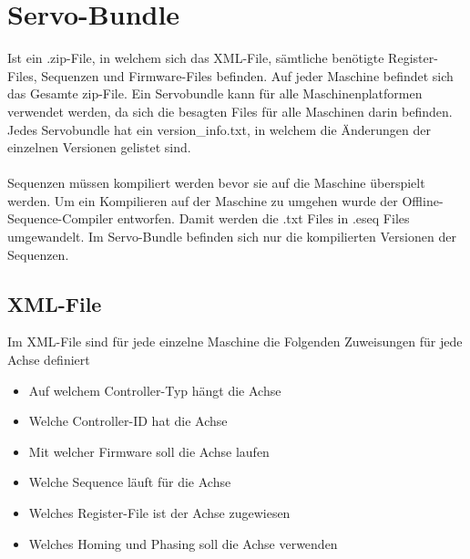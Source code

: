 \section{Servo-Bundle}
	Ist ein .zip-File, in welchem sich das XML-File, sämtliche benötigte Register-Files, Sequenzen und Firmware-Files befinden. Auf jeder Maschine befindet sich das Gesamte zip-File. Ein Servobundle kann für alle Maschinenplatformen verwendet werden, da sich die besagten Files für alle Maschinen darin befinden. Jedes Servobundle hat ein version\_info.txt, in welchem die Änderungen der einzelnen Versionen gelistet sind.\\\\ Sequenzen müssen kompiliert werden bevor sie auf die Maschine überspielt werden. Um ein Kompilieren auf der Maschine zu umgehen wurde der Offline-Sequence-Compiler entworfen. Damit werden die .txt Files in .eseq Files umgewandelt. Im Servo-Bundle befinden sich nur die kompilierten Versionen der Sequenzen.
	\subsection{XML-File}
		Im XML-File sind für jede einzelne Maschine die Folgenden Zuweisungen für jede Achse definiert
		\begin{itemize}
			\item Auf welchem Controller-Typ hängt die Achse
			\item Welche Controller-ID hat die Achse
			\item Mit welcher Firmware soll die Achse laufen
			\item Welche Sequence läuft für die Achse
			\item Welches Register-File ist der Achse zugewiesen
			\item Welches Homing und Phasing soll die Achse verwenden
		\end{itemize}